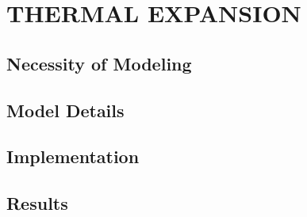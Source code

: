 \chapter{THERMAL EXPANSION}
\label{ch:thermalExpansion}

\section{Necessity of Modeling}

\section{Model Details}

\section{Implementation}

\section{Results}
